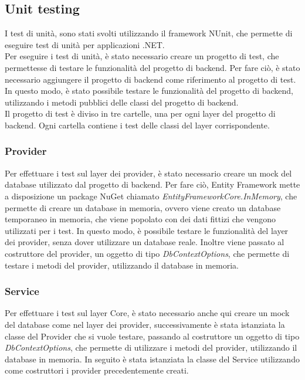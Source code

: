 \subsection{Unit testing}
I test di unità, sono stati svolti utilizzando il framework NUnit, che permette di eseguire test di unità per applicazioni .NET.\\
Per eseguire i test di unità, è stato necessario creare un progetto di test, che permettesse di testare le funzionalità del progetto di backend. Per fare ciò, è stato necessario aggiungere il progetto di backend come riferimento al progetto di test. In questo modo, è stato possibile testare le funzionalità del progetto di backend, utilizzando i metodi pubblici delle classi del progetto di backend.\\
Il progetto di test è diviso in tre cartelle, una per ogni layer del progetto di backend. Ogni cartella contiene i test delle classi del layer corrispondente.\\
\subsubsection{Provider}
Per effettuare i test sul layer dei provider, è stato necessario creare un mock del database utilizzato dal progetto di backend. Per fare ciò, Entity Framework mette a disposizione un package NuGet chiamato \textit{EntityFrameworkCore.InMemory}, che permette di creare un database in memoria, ovvero viene creato un database temporaneo in memoria, che viene popolato con dei dati fittizi che vengono utilizzati per i test. In questo modo, è possibile testare le funzionalità del layer dei provider, senza dover utilizzare un database reale. Inoltre viene passato al costruttore del provider, un oggetto di tipo \textit{DbContextOptions}, che permette di testare i metodi del provider, utilizzando il database in memoria.\\

\subsubsection{Service}
Per effettuare i test sul layer Core, è stato necessario anche qui creare un mock del database come nel layer dei provider, successivamente è stata istanziata la classe del Provider che si vuole testare, passando al costruttore un oggetto di tipo \textit{DbContextOptions}, che permette di utilizzare i metodi del provider, utilizzando il database in memoria. In seguito è stata istanziata la classe del Service utilizzando come costruttori i provider precedentemente creati.\\

